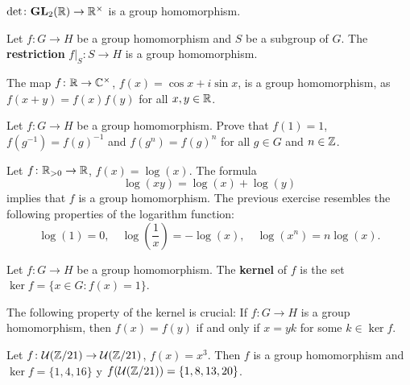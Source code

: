 \begin{example}
$\det\colon\mathbf{GL}_2(\mathbb{R})\to\mathbb{R}^\times$ is a group homomorphism. 
\end{example}

\begin{example}
    Let $f\colon G\to H$ be a group homomorphism and
    $S$ be a subgroup of $G$.
    The \textbf{restriction} $f|_S\colon S\to H$ is a group homomorphism. 
\end{example}

\begin{example}
The map $f\colon\mathbb{R}\to\mathbb{C}^\times$, $f(x)=\cos x+i\sin x$, is a group
homomorphism, as 
$f(x+y)=f(x)f(y)$ for all $x,y\in\mathbb{R}$.
\end{example}

\begin{exercise}
Let $f\colon G\to H$ be a group homomorphism. Prove that 
$f(1)=1$, $f(g^{-1})=f(g)^{-1}$ and 
$f(g^n)=f(g)^n$ for all $g\in G$ and $n\in\mathbb{Z}$.
\end{exercise}

\begin{example}
Let $f\colon\mathbb{R}_{>0}\to\mathbb{R}$, $f(x)=\log(x)$. The formula 
\[\log(xy)=\log(x)+
\log(y)
\]
implies that $f$ is a group homomorphism. 
The previous exercise resembles 
the following properties of the logarithm function: 
\[
\log(1)=0,
\quad
\log\left(\frac{1}{x}\right)=-\log(x),
\quad
\log(x^n)=n\log(x).
\]
\end{example}

\begin{definition}
        Let $f\colon G\to H$ be a group homomorphism. The \textbf{kernel} of $f$
        is the set 
        $\ker f=\{x\in G:f(x)=1\}$.
\end{definition}

The following property of the kernel is crucial: If $f\colon G\to H$
is a group homomorphism, then 
$f(x)=f(y)$ if and only if $x=yk$ for some $k\in\ker f$.

\begin{example}
Let $f\colon\mathcal{U}(\mathbb{Z}/21)\to\mathcal{U}(\mathbb{Z}/21)$, $f(x)=x^3$. 
Then $f$ is a group homomorphism and 
$\ker f=\{1,4,16\}$ y $f(\mathcal{U}(\mathbb{Z}/21))=\{1,8,13,20\}$.
\end{example}

